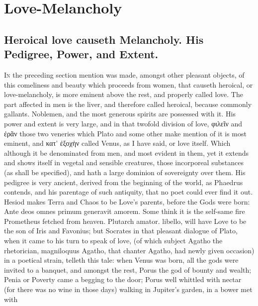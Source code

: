 \chapter{Love-Melancholy}
{

\section[Heroical love]{Heroical love causeth Melancholy. His Pedigree, Power, and Extent.}\label{sec:heroical-love}

\lettrine{I}{n} the preceding section mention was made, amongst other pleasant
objects, of this comeliness and beauty which proceeds from women, that
causeth heroical, or love-melancholy, is more eminent above the rest,
and properly called love. The part affected in men is the liver, and
therefore called heroical, because commonly gallants. Noblemen, and the
most generous spirits are possessed with it. His power and extent is
very large,  and in that twofold division of love, \textgreek{φιλεῖν} and
\textgreek{ἐρᾶν} those two veneries which Plato and some other make mention
of it is most eminent, and \textgreek{κατ' ἐξοχὴν} called Venus, as I have said, or
love itself. Which although it be denominated from men, and most
evident in them, yet it extends and shows itself in vegetal and
sensible creatures, those incorporeal substances (as shall be
specified), and hath a large dominion of sovereignty over them. His
pedigree is very ancient, derived from the beginning of the world, as
Phaedrus contends, and his  parentage of such antiquity,
that no poet could ever find it out. Hesiod makes Terra and Chaos
to be Love's parents, before the Gods were born: Ante deos omnes primum
generavit amorem. Some think it is the self-same fire Prometheus
fetched from heaven. Plutarch amator. libello, will have Love to be the
son of Iris and Favonius; but Socrates in that pleasant dialogue of
Plato, when it came to his turn to speak of love, (of which subject
Agatho the rhetorician, magniloquus Agatho, that chanter Agatho, had
newly given occasion) in a poetical strain, telleth this tale: when
Venus was born, all the gods were invited to a banquet, and amongst the
rest, Porus the god of bounty and wealth; Penia or Poverty came a
begging to the door; Porus well whittled with nectar (for there was no
wine in those days) walking in Jupiter's garden, in a bower met with
}

